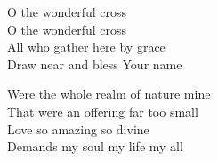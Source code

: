 \documentclass{beamer}
\begin{document}
{\begin{frame}{}
\end{frame}

\hypertarget{The wonderful cross['When I survey'](Tomlin)-}{}
\begin{frame}{}
\fontsize{ 20 }{ 27 }\selectfont

O the wonderful cross\\ 
O the wonderful cross\\ 
All who gather here by grace\\ 
Draw near and bless Your name 

\end{frame}

\hypertarget{The wonderful cross['When I survey'](Tomlin)3}{}
\begin{frame}{}
\fontsize{ 20 }{ 27 }\selectfont

Were the whole realm of nature mine\\ 
That were an offering far too small\\ 
Love so amazing so divine\\ 
Demands my soul my life my all 

\end{frame}

}
\end{document}

